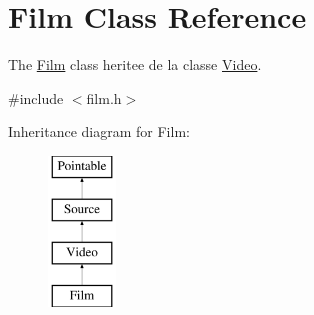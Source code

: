 \hypertarget{classFilm}{\section{Film Class Reference}
\label{classFilm}
}


The \hyperlink{classFilm}{Film} class heritee de la classe \hyperlink{classVideo}{Video}.  




{\ttfamily \#include $<$film.\-h$>$}

Inheritance diagram for Film\-:\begin{figure}[H]
\begin{center}
\leavevmode
\includegraphics[height=4.000000cm]{classFilm}
\end{center}
\end{figure}
